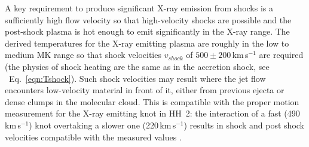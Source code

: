 \documentclass[graybox, nosecnum]{svmult}
\begin{document}
A key requirement to produce significant X-ray emission from shocks is a sufficiently high flow velocity so that high-velocity shocks are possible and the post-shock plasma is hot enough to emit significantly in the X-ray range. The derived temperatures for the X-ray emitting plasma are roughly  in the low to medium MK range so that shock velocities $v_{shock}$ of $500\pm200$\,km\,s$^{-1}$ are required (the physics of shock heating are the same as in the accretion shock, see ~Eq.~\ref{eqn:Tshock}). Such shock velocities may result where the jet flow encounters low-velocity  material in front of it, either from previous ejecta or dense clumps in the molecular cloud. This is compatible with the proper motion measurement for the X-ray emitting knot in HH~2: the interaction of a fast (490\,km\,s$^{-1}$) knot overtaking a slower one (220\,km\,s$^{-1}$) results in shock and post shock velocities compatible with the measured values \cite{Schneider_2012}.
\end{document}
